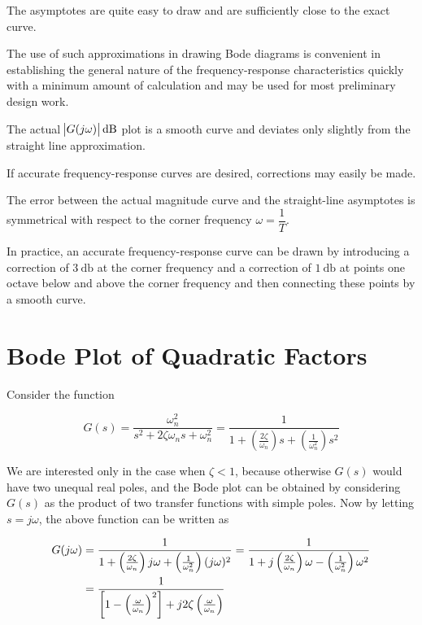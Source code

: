 \documentclass[
  14pt,
  a4paper,
  oneside,
  open=any,
  a4paper,
  14pt]{report}
\begin{document}
The asymptotes are quite easy to draw and are sufficiently close to the
exact curve.

The use of such approximations in drawing Bode diagrams is convenient in
establishing the general nature of the frequency-response
characteristics quickly with a minimum amount of calculation and may be
used for most preliminary design work.

The actual \(\abs{G(j\omega)}\unit{\decibel}\) plot is a smooth curve
and deviates only slightly from the straight line approximation.

If accurate frequency-response curves are desired, corrections may
easily be made.

The error between the actual magnitude curve and the straight-line
asymptotes is symmetrical with respect to the corner frequency
\(\omega=\dfrac{1}{T}\).

In practice, an accurate frequency-response curve can be drawn by
introducing a correction of \(\SI{3}{\decibel}\) at the corner frequency
and a correction of \(\SI{1}{\decibel}\) at points one octave below and
above the corner frequency and then connecting these points by a smooth
curve.

\newpage{}

\section{Bode Plot of Quadratic
Factors}\label{bode-plot-of-quadratic-factors}

Consider the function

\[
    G(s) = \dfrac{\omega_n^2}{s^2 + 2\zeta\omega_n s + \omega_n^2} = \dfrac{1}{1+\left(\frac{2\zeta}{\omega_n}\right)s + \left(\frac{1}{\omega_n^2}\right)s^2}
\]

We are interested only in the case when \(\zeta < 1\), because otherwise
\(G(s)\) would have two unequal real poles, and the Bode plot can be
obtained by considering \(G(s)\) as the product of two transfer
functions with simple poles. Now by letting \(s=j\omega\), the above
function can be written as

\[
\begin{aligned}
    G(j\omega) &= \dfrac{1}{1+\left(\frac{2\zeta}{\omega_n} \right)j\omega + \left(\frac{1}{\omega_n^2}\right)(j\omega)^2} = \dfrac{1}{1+j\left(\frac{2\zeta}{\omega_n}\right)\omega - \left(\frac{1}{\omega_n^2}\right)\omega^2} \\ 
    &= \dfrac{1}{\left[1-\left(\frac{\omega}{\omega_n}\right)^2 \right] + \complexnum[output-complex-root = j, complex-root-position = before-number, print-complex-unity]{2j}\zeta\left(\frac{\omega}{\omega_n}\right)}
\end{aligned}
\]
\end{document}
